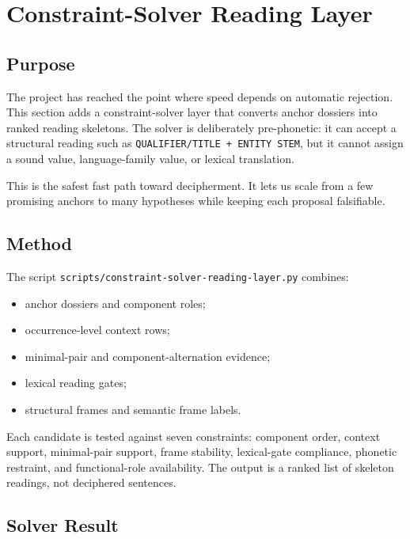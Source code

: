 \section{Constraint-Solver Reading Layer}

\subsection{Purpose}

The project has reached the point where speed depends on automatic rejection. This section adds a constraint-solver layer that converts anchor dossiers into ranked reading skeletons. The solver is deliberately pre-phonetic: it can accept a structural reading such as \texttt{QUALIFIER/TITLE + ENTITY STEM}, but it cannot assign a sound value, language-family value, or lexical translation.

This is the safest fast path toward decipherment. It lets us scale from a few promising anchors to many hypotheses while keeping each proposal falsifiable.

\subsection{Method}

The script \texttt{scripts/constraint-solver-reading-layer.py} combines:

\begin{itemize}
  \item anchor dossiers and component roles;
  \item occurrence-level context rows;
  \item minimal-pair and component-alternation evidence;
  \item lexical reading gates;
  \item structural frames and semantic frame labels.
\end{itemize}

Each candidate is tested against seven constraints: component order, context support, minimal-pair support, frame stability, lexical-gate compliance, phonetic restraint, and functional-role availability. The output is a ranked list of skeleton readings, not deciphered sentences.

\subsection{Solver Result}

